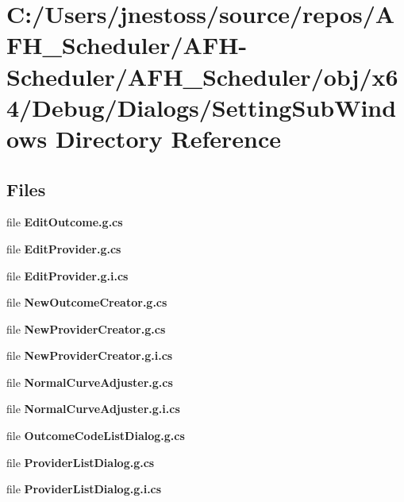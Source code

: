 \section{C\+:/\+Users/jnestoss/source/repos/\+A\+F\+H\+\_\+\+Scheduler/\+A\+F\+H-\/\+Scheduler/\+A\+F\+H\+\_\+\+Scheduler/obj/x64/\+Debug/\+Dialogs/\+Setting\+Sub\+Windows Directory Reference}
\label{dir_db7980502b88bec2ba9bc6f8e79a4cf2}
\subsection*{Files}
\begin{DoxyCompactItemize}
\item 
file \textbf{ Edit\+Outcome.\+g.\+cs}
\item 
file \textbf{ Edit\+Provider.\+g.\+cs}
\item 
file \textbf{ Edit\+Provider.\+g.\+i.\+cs}
\item 
file \textbf{ New\+Outcome\+Creator.\+g.\+cs}
\item 
file \textbf{ New\+Provider\+Creator.\+g.\+cs}
\item 
file \textbf{ New\+Provider\+Creator.\+g.\+i.\+cs}
\item 
file \textbf{ Normal\+Curve\+Adjuster.\+g.\+cs}
\item 
file \textbf{ Normal\+Curve\+Adjuster.\+g.\+i.\+cs}
\item 
file \textbf{ Outcome\+Code\+List\+Dialog.\+g.\+cs}
\item 
file \textbf{ Provider\+List\+Dialog.\+g.\+cs}
\item 
file \textbf{ Provider\+List\+Dialog.\+g.\+i.\+cs}
\end{DoxyCompactItemize}
